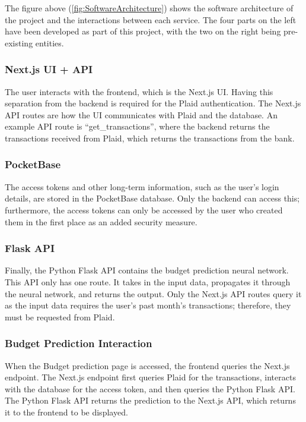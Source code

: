 The figure above (\ref{fig:SoftwareArchitecture}) shows the software architecture of the project and the interactions between each service. The four parts on the left have been developed as part of this project, with the two on the right being pre-existing entities.

\subsubsection{Next.js UI + API}
The user interacts with the frontend, which is the Next.js UI. Having this separation from the backend is required for the Plaid authentication. The Next.js API routes are how the UI communicates with Plaid and the database. An example API route is ``get\_transactions'', where the backend returns the transactions received from Plaid, which returns the transactions from the bank.

\subsubsection{PocketBase}
The access tokens and other long-term information, such as the user's login details, are stored in the PocketBase database. Only the backend can access this; furthermore, the access tokens can only be accessed by the user who created them in the first place as an added security measure.

\subsubsection{Flask API}
Finally, the Python Flask API contains the budget prediction neural network. This API only has one route. It takes in the input data, propagates it through the neural network, and returns the output. Only the Next.js API routes query it as the input data requires the user's past month's transactions; therefore, they must be requested from Plaid.

\subsubsection{Budget Prediction Interaction}
When the Budget prediction page is accessed, the frontend queries the Next.js endpoint. The Next.js endpoint first queries Plaid for the transactions, interacts with the database for the access token, and then queries the Python Flask API. The Python Flask API returns the prediction to the Next.js API, which returns it to the frontend to be displayed.

